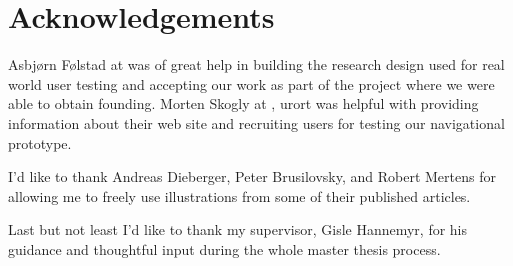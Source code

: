 \chapter{Acknowledgements}

Asbj\o{}rn F\o{}lstad at  was of great help in building the
research design used for real world user testing and accepting our work as
part of the  project where we were able to obtain founding.
Morten Skogly at ,
urort{} was helpful with providing information about their web site and
recruiting users for testing our navigational prototype.

I'd like to thank
Andreas Dieberger,
Peter Brusilovsky, and
Robert Mer\-t\-ens
for allowing me to freely use illustrations from
some of their published articles.

Last but not least I'd like to thank my supervisor, Gisle Hannemyr, for
his guidance and thoughtful input during the whole master thesis process.

